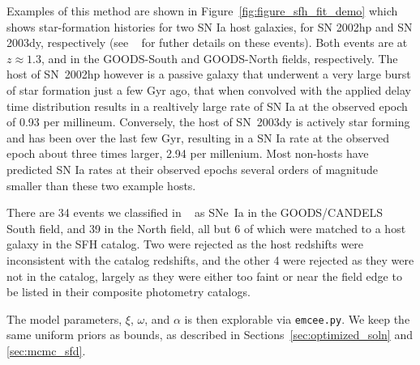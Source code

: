 \documentclass[apj]{aastex62}
\begin{document}
Examples of this method are shown in Figure~\ref{fig:figure_sfh_fit_demo} which shows star-formation histories for two SN Ia host galaxies, for SN 2002hp and SN 2003dy, respectively (see ~\cite{Strolger:2004} for futher details on these events). Both events are at $z\approx 1.3$, and in the GOODS-South and GOODS-North fields, respectively. The host of SN~2002hp however is a passive galaxy that underwent a very large burst of star formation just a few Gyr ago, that when convolved with the applied delay time distribution results in a realtively large rate of SN Ia at the observed epoch of 0.93 per millineum.  Conversely, the host of SN~2003dy is actively star forming and has been over the last few Gyr, resulting in a SN Ia rate at the observed epoch about three times larger, 2.94 per millenium. Most non-hosts have predicted SN Ia rates at their observed epochs several orders of magnitude smaller than these two example hosts. 
  
There are 34 events we classified in ~\cite{Strolger:2004, Dahlen:2008, Rodney:2014} as SNe~Ia in the GOODS/CANDELS South field, and 39 in the North field, all but 6 of which were matched to a host galaxy in the SFH catalog. Two were rejected as the host redshifts were inconsistent with the catalog redshifts, and the other 4 were rejected as they were not in the catalog, largely as they were either too faint or near the field edge to be listed in their composite photometry catalogs. 

The model parameters, $\xi$, $\omega$, and $\alpha$ is then explorable via {\tt emcee.py}. We keep the same uniform priors as bounds, as described in Sections~\ref{sec:optimized_soln} and \ref{sec:mcmc_sfd}.
\end{document}
